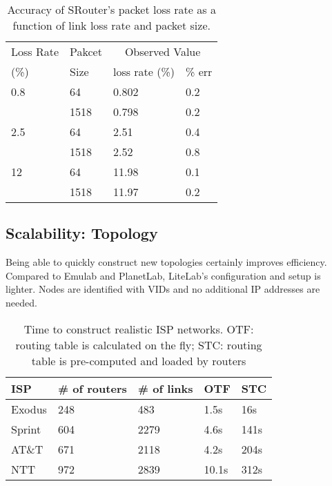\documentclass[conference]{IEEEtran}
\begin{document}
\begin{table}[!tb]
  \caption{Accuracy of SRouter's packet loss rate as a function of link loss rate and packet size.}
  \begin{tabular}{ | p{1.2cm} | p{1cm} || p{2.2cm} | p{2.2cm} | }
    \hline
    Loss Rate & Pakcet & \multicolumn{2}{c|}{Observed Value} \\
    (\%)    & Size   & loss rate (\%) & \% err \\
    \hline
    0.8 & 64 & 0.802 & 0.2 \\
    & 1518 & 0.798 & 0.2 \\
    \hline
    2.5 & 64 & 2.51 & 0.4 \\
    & 1518 & 2.52 & 0.8 \\
    \hline
    12 & 64 & 11.98 & 0.1 \\
    & 1518 & 11.97 & 0.2 \\
    \hline
  \end{tabular}
  \label{sec:evaluation:tab:lossrate}
\end{table}


\subsection{Scalability: Topology}
\label{sec:evaluation:topology}

Being able to quickly construct new topologies certainly improves
efficiency.  Compared to Emulab and PlanetLab, LiteLab's configuration
and setup is lighter. Nodes are identified with VIDs and no additional
IP addresses are needed.




\begin{table}[!tb]
  \caption{Time to construct realistic ISP networks. OTF: routing
    table is calculated on the fly; STC: routing table is pre-computed
    and loaded by routers} 
  \begin{tabular}{ | p{1.2cm} | p{1.3cm} | p{1.3cm} | p{1.3cm} | p{1.3cm} | }
    \hline
    ISP & \# of routers & \# of links & OTF & STC \\
    \hline
    Exodus & 248 & 483 & 1.5s & 16s \\
    \hline
    Sprint & 604 & 2279 & 4.6s & 141s \\
    \hline
    AT\&T & 671 & 2118 & 4.2s & 204s \\
    \hline
    NTT & 972 & 2839 & 10.1s &  312s\\
    \hline
  \end{tabular}
  \label{sec:evaluation:tab:topology}
  \vskip -5mm
\end{table}
\end{document}
